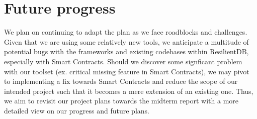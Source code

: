 \section{Future progress}
We plan on continuing to adapt the plan as we face roadblocks and challenges.
Given that we are using some relatively new tools, we anticipate a multitude of potential bugs with
the frameworks and existing codebases within ResilientDB, especially with Smart Contracts.
Should we discover some signficant problem with our toolset (ex. critical missing feature in Smart
Contracts), we may pivot to implementing a fix towards Smart Contracts and reduce the scope of our
intended project such that it becomes a mere extension of an existing one.
Thus, we aim to revisit our project plans towards the midterm report with a more detailed view on
our progress and future plans. 
